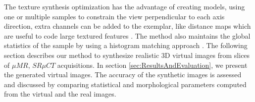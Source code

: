The texture synthesis optimization has the advantage of creating models, using one or multiple samples 
to constrain the view perpendicular to each axis direction, extra channels can be added to the exemplar, like distance maps 
which are useful to code large textured features \cite{Lefebvre:2006:ATS:1141911.1141921}.
The method also maintains the global statistics of the sample by using a histogram matching approach \cite{ROLLAND2000}.
The following section describes our method to synthesize realistic 3D virtual images from slices of $\mu{MR}$, $SR \mu{CT}$ acquisitions.
In section \ref{sec:ResultsAndEvaluation}, we present the generated virtual images. 
The accuracy of the synthetic images is assessed and discussed by comparing statistical and morphological parameters computed from the virtual and the real images. 